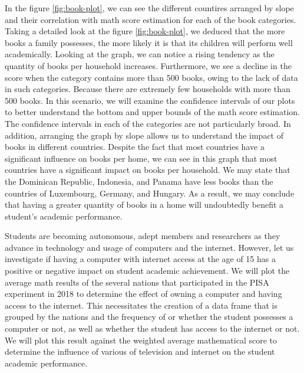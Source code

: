 In the figure \ref{fig:book-plot}, we can see the different countires
arranged by slope and their correlation with math score estimation for
each of the book categories. Taking a detailed look at the figure
\ref{fig:book-plot}, we deduced that the more books a family possesses,
the more likely it is that its children will perform well academically.
Looking at the graph, we can notice a rising tendency as the quantity of
books per household increases. Furthermore, we see a decline in the
score when the category contains more than 500 books, owing to the lack
of data in such categories. Because there are extremely few households
with more than 500 books. In this scenario, we will examine the
confidence intervals of our plots to better understand the bottom and
upper bounds of the math score estimation. The confidence intervals in
each of the categories are not particularly broad. In addition,
arranging the graph by slope allows us to understand the impact of books
in different countries. Despite the fact that most countries have a
significant influence on books per home, we can see in this graph that
most countries have a significant impact on books per household. We may
state that the Dominican Republic, Indonesia, and Panama have less books
than the countries of Luxembourg, Germany, and Hungary. As a result, we
may conclude that having a greater quantity of books in a home will
undoubtedly benefit a student's academic performance.

Students are becoming autonomous, adept members and researchers as they
advance in technology and usage of computers and the internet. However,
let us investigate if having a computer with internet access at the age
of 15 has a positive or negative impact on student academic achievement.
We will plot the average math results of the several nations that
participated in the PISA experiment in 2018 to determine the effect of
owning a computer and having access to the internet. This necessitates
the creation of a data frame that is grouped by the nations and the
frequency of or whether the student possesses a computer or not, as well
as whether the student has access to the internet or not. We will plot
this result against the weighted average mathematical score to determine
the influence of various of television and internet on the student
academic performance.

